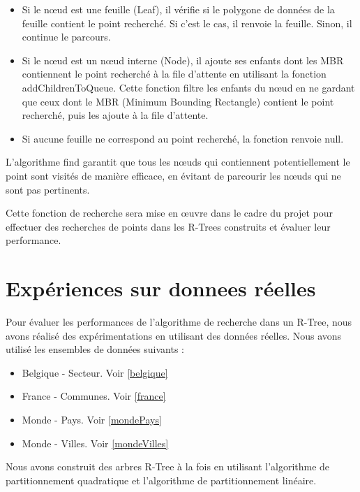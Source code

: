 \documentclass {article}
\begin{document}
\begin{itemize}
    \item Si le nœud est une feuille (Leaf), il vérifie si le polygone de données de la feuille contient le point
	recherché. Si c'est le cas, il renvoie la feuille.
	Sinon, il continue le parcours.
    \item Si le nœud est un nœud interne (Node), il ajoute ses enfants dont les MBR contiennent le point
	recherché à la file d'attente en utilisant la fonction addChildrenToQueue.
	Cette fonction filtre les enfants du nœud en ne gardant que ceux dont le MBR (Minimum Bounding Rectangle)
	contient le point recherché, puis les ajoute à la file d'attente.
    \item Si aucune feuille ne correspond au point recherché, la fonction renvoie null.
\end{itemize}

L'algorithme find garantit que tous les nœuds qui contiennent potentiellement le point sont visités de manière
efficace, en évitant de parcourir les nœuds qui ne sont pas pertinents.

Cette fonction de recherche sera mise en œuvre dans le cadre du projet pour effectuer des recherches
de points dans les R-Trees construits et évaluer leur performance.



\section {Expériences sur donnees réelles}


Pour évaluer les performances de l'algorithme de recherche dans un R-Tree,
nous avons réalisé des expérimentations en utilisant des données réelles.
Nous avons utilisé les ensembles de données suivants :

\begin{itemize}

    \item Belgique - Secteur. Voir \ref{belgique}
    \item France - Communes. Voir \ref{france}
    \item Monde - Pays. Voir \ref{mondePays}
    \item Monde - Villes. Voir \ref{mondeVilles}
\end{itemize}

Nous avons construit des arbres R-Tree à la fois en utilisant l'algorithme de partitionnement quadratique
et l'algorithme de partitionnement linéaire.
\end{document}
